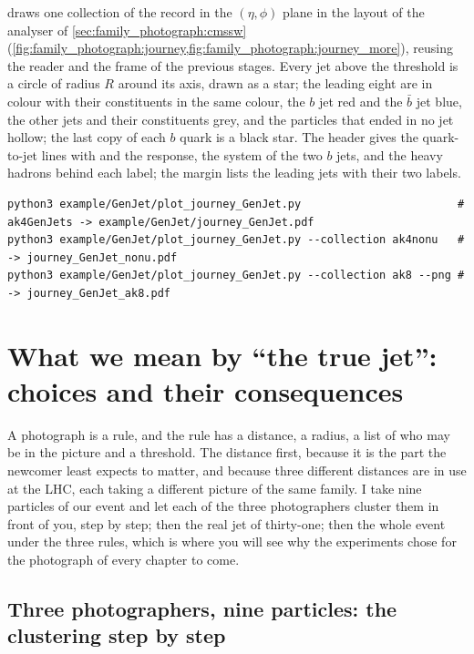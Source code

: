  draws one collection of the
record in the $(\eta,\phi)$ plane in the layout of the \CMSSW analyser of
\cref{sec:family_photograph:cmssw}
(\cref{fig:family_photograph:journey,fig:family_photograph:journey_more}),
reusing the reader and the frame of the previous stages. Every jet above
the threshold is a circle of radius $R$ around its axis, drawn as a star;
the leading eight are in colour with their constituents in the same
colour, the $b$ jet red and the $\bar b$ jet blue, the other jets and
their constituents grey, and the particles that ended in no jet hollow;
the last copy of each $b$ quark is a black star. The header gives the
quark-to-jet lines with \dR and the response, the system of the two $b$
jets, and the heavy hadrons behind each \hadflav label; the margin lists
the leading jets with their two \CMSSW labels.
\begin{verbatim}
python3 example/GenJet/plot_journey_GenJet.py                        # ak4GenJets -> example/GenJet/journey_GenJet.pdf
python3 example/GenJet/plot_journey_GenJet.py --collection ak4nonu   # -> journey_GenJet_nonu.pdf
python3 example/GenJet/plot_journey_GenJet.py --collection ak8 --png # -> journey_GenJet_ak8.pdf
\end{verbatim}

\section{What we mean by ``the true jet'': choices and their consequences}
\label{sec:family_photograph:what_we_mean_by_the_true_jet_choices_and}

A photograph is a rule, and the rule has a distance, a radius, a list of
who may be in the picture and a threshold. The distance first, because it
is the part the newcomer least expects to matter, and because three
different distances are in use at the LHC, each taking a different
picture of the same family. I take nine particles of our event and let
each of the three photographers cluster them in front of you, step by
step; then the real jet of thirty-one; then the whole event under the
three rules, which is where you will see why the experiments chose
\antikt for the photograph of every chapter to come.

\subsection{Three photographers, nine particles: the clustering step by step}
\label{sec:family_photograph:nine_particles}


